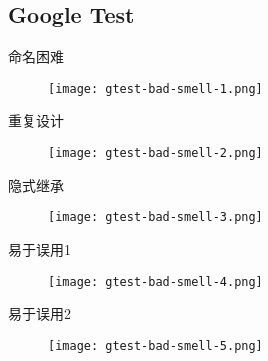 \subsection{Google Test}

\begin{frame}{命名困难}
    \centering
    \begin{figure}
      \centering
      \texttt{[image: gtest-bad-smell-1.png]}
    \end{figure}
\end{frame}

\begin{frame}{重复设计}
    \centering
    \begin{figure}
      \centering
      \texttt{[image: gtest-bad-smell-2.png]}
    \end{figure}
\end{frame}

\begin{frame}{隐式继承}
    \centering
    \begin{figure}
      \centering
      \texttt{[image: gtest-bad-smell-3.png]}
    \end{figure}
\end{frame}

\begin{frame}{易于误用1}
    \centering
    \begin{figure}
      \centering
      \texttt{[image: gtest-bad-smell-4.png]}
    \end{figure}
\end{frame}

\begin{frame}{易于误用2}
    \centering
    \begin{figure}
      \centering
      \texttt{[image: gtest-bad-smell-5.png]}
    \end{figure}
\end{frame}

